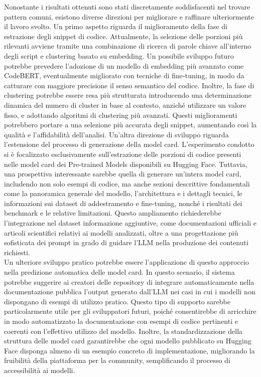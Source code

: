 \documentclass{article}
\begin{document}
Nonostante i risultati ottenuti sono stati discretamente soddisfacenti nel trovare pattern comuni, esistono diverse direzioni per migliorare e raffinare ulteriormente il lavoro svolto. Un primo aspetto riguarda il miglioramento della fase di estrazione degli snippet di codice. Attualmente, la selezione delle porzioni più rilevanti avviene tramite una combinazione di ricerca di parole chiave all'interno degli script e clustering basato su embedding. Un possibile sviluppo futuro potrebbe prevedere l’adozione di un modello di embedding più avanzato come CodeBERT, eventualmente migliorato con tecniche di fine-tuning, in modo da catturare con maggiore precisione il senso semantico del codice. Inoltre, la fase di clustering potrebbe essere resa più strutturata introducendo una determinazione dinamica del numero di cluster in base al contesto, anziché utilizzare un valore fisso, e adottando algoritmi di clustering più avanzati. Questi miglioramenti potrebbero portare a una selezione più accurata degli snippet, aumentando così la qualità e l’affidabilità dell’analisi.
Un'altra direzione di sviluppo riguarda l'estensione del processo di generazione della model card. L’esperimento condotto si è focalizzato esclusivamente sull’estrazione delle porzioni di codice presenti nelle model card dei Pre-trained Models disponibili su Hugging Face. Tuttavia, una prospettiva interessante sarebbe quella di generare un'intera model card, includendo non solo esempi di codice, ma anche sezioni descrittive fondamentali come la panoramica generale del modello, l'architettura e i dettagli tecnici, le informazioni sui dataset di addestramento e fine-tuning, nonché i risultati dei benchmark e le relative limitazioni. Questo ampliamento richiederebbe l’integrazione nel dataset informazione aggiuntive, come documentazioni ufficiali e articoli scientifici relativi ai modelli analizzati, oltre a una progettazione più sofisticata dei prompt in grado di guidare l’LLM nella produzione dei contenuti richiesti.\\
Un ulteriore sviluppo pratico potrebbe essere l'applicazione di questo approccio nella predizione automatica delle model card. In questo scenario, il sistema potrebbe suggerire ai creatori delle repository di integrare automaticamente nella documentazione pubblica l’output generato dall’LLM nei casi in cui i modelli non dispongano di esempi di utilizzo pratico. Questo tipo di supporto sarebbe particolarmente utile per gli sviluppatori futuri, poiché consentirebbe di arricchire in modo automatizzato la documentazione con esempi di codice pertinenti e coerenti con l'effettivo utilizzo del modello. Inoltre, la standardizzazione della struttura delle model card garantirebbe che ogni modello pubblicato su Hugging Face disponga almeno di un esempio concreto di implementazione, migliorando la fruibilità della piattaforma per la community, semplificando il processo di accessibilità ai modelli.\\
\end{document}
